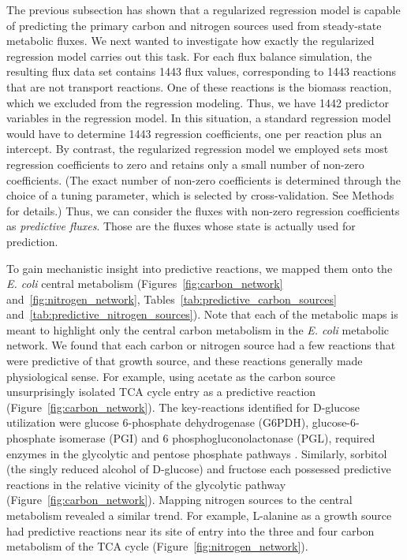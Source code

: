\documentclass[12pt]{article}
\begin{document}
The previous subsection has shown that a regularized regression model is capable of predicting the primary carbon and nitrogen sources used from steady-state metabolic fluxes. We next wanted to investigate how exactly the regularized regression model carries out this task. For each flux balance simulation, the resulting flux data set contains 1443 flux values, corresponding to 1443 reactions that are not transport reactions. One of these reactions is the biomass reaction, which we excluded from the regression modeling. Thus, we have 1442 predictor variables in the regression model. In this situation, a standard regression model would have to determine 1443 regression coefficients, one per reaction plus an intercept. By contrast, the regularized regression model we employed sets most regression coefficients to zero and retains only a small number of non-zero coefficients. (The exact number of non-zero coefficients is determined through the choice of a tuning parameter, which is selected by cross-validation. See Methods for details.) Thus, we can consider the fluxes with non-zero regression coefficients as \emph{predictive fluxes}. Those are the fluxes whose state is actually used for prediction.

To gain mechanistic insight into predictive reactions, we mapped them onto the \emph{E. coli} central metabolism (Figures~\ref{fig:carbon_network} and~\ref{fig:nitrogen_network}, Tables~\ref{tab:predictive_carbon_sources} and~\ref{tab:predictive_nitrogen_sources}). Note that each of the metabolic maps is meant to highlight only the central carbon metabolism in the \emph{E. coli} metabolic network. We found that each carbon or nitrogen source had a few reactions that were predictive of that growth source, and these reactions generally made physiological sense. For example, using acetate as the carbon source unsurprisingly isolated TCA cycle entry as a predictive reaction (Figure~\ref{fig:carbon_network}). The key-reactions identified for D-glucose utilization were glucose 6-phosphate dehydrogenase (G6PDH), glucose-6-phosphate isomerase (PGI) and 6 phosphogluconolactonase (PGL), required enzymes in the glycolytic and pentose phosphate pathways \cite{KuporFraenkel1972}. Similarly, sorbitol (the singly reduced alcohol of D-glucose) and fructose each possessed predictive reactions in the relative vicinity of the glycolytic pathway (Figure~\ref{fig:carbon_network}). Mapping nitrogen sources to the central metabolism revealed a similar trend. For example, L-alanine as a growth source had predictive reactions near its site of entry into the three and four carbon metabolism of the TCA cycle (Figure~\ref{fig:nitrogen_network}).
\end{document}
